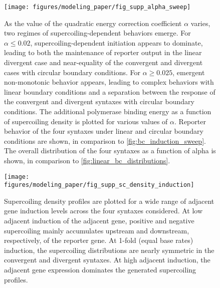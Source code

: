 \documentclass[11pt]{article}
\begin{document}
\begin{figure}[hbtp]
    \centering
    {\texttt{[image: figures/modeling\_paper/fig\_supp\_alpha\_sweep]}
    \label{fig:supp_alpha_sweep_induction}
    \label{fig:supp_alpha_sweep_energy}
    \label{fig:supp_alpha_sweep_linear}
    \label{fig:supp_alpha_sweep_circular}
    \label{fig:supp_alpha_sweep_distribution}
    }
    \caption{As the value of the quadratic energy correction coefficient \(\alpha\) varies, two regimes of supercoiling-dependent behaviors emerge.
         For \(\alpha \leq 0.02\), supercoiling-dependent initiation appears to dominate, leading to both the maintenance of reporter output in the linear divergent case and near-equality of the convergent and divergent cases with circular boundary conditions. For \(\alpha \geq 0.025\), emergent non-monotonic behavior appears, leading to complex behaviors with linear boundary conditions and a separation between the response of the convergent and divergent syntaxes with circular boundary conditions.
         The additional polymerase binding energy as a function of supercoiling density is plotted for various values of \(\alpha\).
          Reporter behavior of the four syntaxes under linear and circular boundary conditions are shown, in comparison to \cref{fig:bc_induction_sweep}.
         The overall distribution of the four syntaxes as a function of alpha is shown, in comparison to \cref{fig:linear_bc_distributions}.
    }
    \label{fig:top:alpha_sweep}
\end{figure}

\begin{figure}[hbtp]
    \centering
    {\texttt{[image: figures/modeling\_paper/fig\_supp\_sc\_density\_induction]}
    }
    \caption{Supercoiling density profiles are plotted for a wide range of adjacent gene induction levels across the four syntaxes considered. At low adjacent induction of the adjacent gene, positive and negative supercoiling mainly accumulates upstream and downstream, respectively, of the reporter gene. At 1-fold (equal base rates) induction, the supercoiling distributions are nearly symmetric in the convergent and divergent syntaxes. At high adjacent induction, the adjacent gene expression dominates the generated supercoiling profiles.}
    \label{fig:supp:sc_density_induction}
\end{figure}
\end{document}
